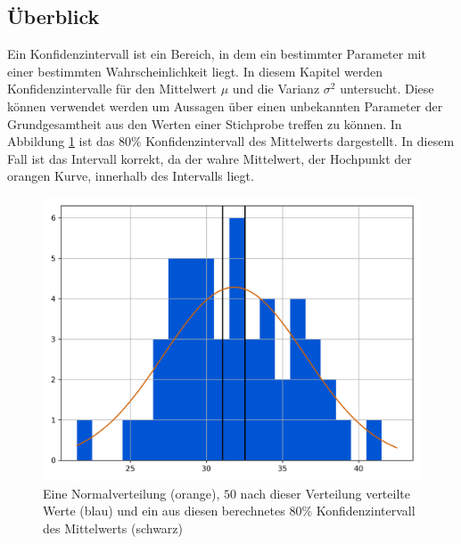 \documentclass[10pt,twocolumn]{scrartcl}
\begin{document}
	\subsection{Überblick}
	\label{chap_sim_results} %

	Ein Konfidenzintervall ist ein Bereich, in dem ein bestimmter Parameter mit einer bestimmten Wahrscheinlichkeit liegt. In diesem Kapitel werden Konfidenzintervalle für den Mittelwert $\mu$ und die Varianz $\sigma^2$ untersucht. Diese können verwendet werden um Aussagen über einen unbekannten Parameter der Grundgesamtheit aus den Werten einer Stichprobe treffen zu können. In Abbildung \ref{fig_mean_interval_hist} ist das $80\%$ Konfidenzintervall des Mittelwerts dargestellt. In diesem Fall ist das Intervall korrekt, da der wahre Mittelwert, der Hochpunkt der orangen Kurve, innerhalb des Intervalls liegt.
	\begin{figure}[h]%
		\centering
		\includegraphics[width=0.9\columnwidth]{images/histogram_50.png}
		\caption{Eine Normalverteilung (orange), $50$ nach dieser Verteilung verteilte Werte (blau) und ein aus diesen berechnetes $80\%$ Konfidenzintervall des Mittelwerts (schwarz)}
		\label{fig_mean_interval_hist}
	\end{figure}
\end{document}
